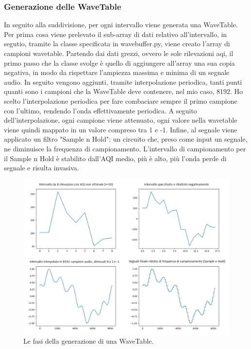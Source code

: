 \subsubsection{Generazione delle WaveTable}
In seguito alla suddivisione, per ogni intervallo viene generata una WaveTable.
Per prima cosa viene prelevato il sub-array di dati relativo all'intervallo, in segutio, tramite la classe specificata in wavebuffer.py, viene creato l'array di campioni wavetable.
Partendo dai dati grezzi, ovvero le sole rilevazioni aqi, il primo passo che la classe svolge è quello di aggiungere all'array una sua copia negativa, in modo da rispettare l'ampiezza massima e minima di un segnale audio.
In seguito vengono aggiunti, tramite interpolazione periodica, tanti punti quanti sono i campioni che la WaveTable deve contenere, nel mio caso, 8192.
Ho scelto l'interpolazione periodica per fare combaciare sempre il primo campione con l'ultimo, rendendo l'onda effettivamente periodica.
A seguito dell'interpolazione, ogni campione viene attenuato, ogni valore nella wavetable viene quindi mappato in un valore compreso tra 1 e -1.
Infine, al segnale viene applicato un filtro "Sample n Hold": un circuito che, preso come input un segnale, ne diminuisce la frequenza di campionamento.
L'intervallo di campionamento per il Sample n Hold è stabilito dall'AQI medio, più è alto, più l'onda perde di segnale e risulta invasiva.
\begin{figure}[h]
  \includegraphics[width=\linewidth]{img/waves.png}
  \caption{Le fasi della generazione di una WaveTable.}
  \label{fig:wavetable}
\end{figure}


